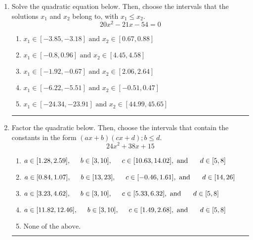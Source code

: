 \documentclass[14pt]{extbook}
\newcommand{\litem}[1]{\item#1\hspace*{-1cm}\rule{\textwidth}{0.4pt}}
\begin{document}
\begin{enumerate}
\litem{
Solve the quadratic equation below. Then, choose the intervals that the solutions $x_1$ and $x_2$ belong to, with $x_1 \leq x_2$.\[ 20x^{2} -21 x -54 = 0 \]\begin{enumerate}[label=\Alph*.]
\item \( x_1 \in [-3.85, -3.18] \text{ and } x_2 \in [0.67, 0.88] \)
\item \( x_1 \in [-0.8, 0.96] \text{ and } x_2 \in [4.45, 4.58] \)
\item \( x_1 \in [-1.92, -0.67] \text{ and } x_2 \in [2.06, 2.64] \)
\item \( x_1 \in [-6.22, -5.51] \text{ and } x_2 \in [-0.51, 0.47] \)
\item \( x_1 \in [-24.34, -23.91] \text{ and } x_2 \in [44.99, 45.65] \)

\end{enumerate} }
\litem{
Factor the quadratic below. Then, choose the intervals that contain the constants in the form $(ax+b)(cx+d); b \leq d.$\[ 24x^{2} +38 x + 15 \]\begin{enumerate}[label=\Alph*.]
\item \( a \in [1.28, 2.59], \hspace*{5mm} b \in [3, 10], \hspace*{5mm} c \in [10.63, 14.02], \text{ and } \hspace*{5mm} d \in [5, 8] \)
\item \( a \in [0.84, 1.07], \hspace*{5mm} b \in [13, 23], \hspace*{5mm} c \in [-0.46, 1.61], \text{ and } \hspace*{5mm} d \in [14, 26] \)
\item \( a \in [3.23, 4.62], \hspace*{5mm} b \in [3, 10], \hspace*{5mm} c \in [5.33, 6.32], \text{ and } \hspace*{5mm} d \in [5, 8] \)
\item \( a \in [11.82, 12.46], \hspace*{5mm} b \in [3, 10], \hspace*{5mm} c \in [1.49, 2.68], \text{ and } \hspace*{5mm} d \in [5, 8] \)
\item \( \text{None of the above.} \)


\end{enumerate}}
\end{enumerate}
\end{document}
